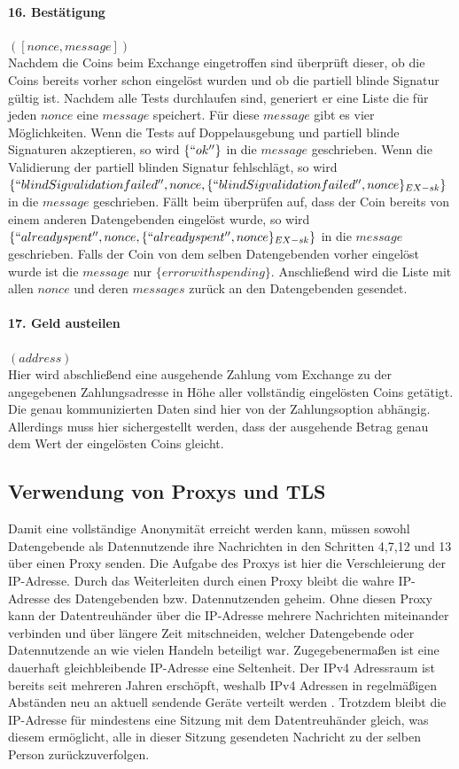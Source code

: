 \documentclass[
	fontsize=12pt,
	headings=small,
	parskip=half,           %
	bibliography=totoc,
	numbers=noenddot,       %
	open=any,               %
]{scrreprt}
\begin{document}
\paragraph{16. Bestätigung} $([nonce, message])$\\
Nachdem die Coins beim Exchange eingetroffen sind überprüft dieser, ob die Coins bereits vorher schon eingelöst wurden und ob die partiell blinde Signatur gültig ist. Nachdem alle Tests durchlaufen sind, generiert er eine Liste die für jeden $nonce$ eine $message$ speichert. Für diese $message$ gibt es vier Möglichkeiten. Wenn die Tests auf Doppelausgebung und partiell blinde Signaturen akzeptieren, so wird $\{``ok''\}$ in die $message$ geschrieben. Wenn die Validierung der partiell blinden Signatur fehlschlägt, so wird $\{``blindSig validation failed'', nonce, \{``blindSig validation failed'', nonce\}_{EX-sk}\}$ in die $message$ geschrieben. Fällt beim überprüfen auf, dass der Coin bereits von einem anderen Datengebenden eingelöst wurde, so wird $\{``already spent'', nonce, \{``already spent'', nonce\}_{EX-sk}\}$ in die $message$ geschrieben. Falls der Coin von dem selben Datengebenden vorher eingelöst wurde ist die $message$ nur $\{error with spending\}$. Anschließend wird die Liste mit allen $nonce$ und deren $messages$ zurück an den Datengebenden gesendet.

\paragraph{17. Geld austeilen} $(address)$\\
Hier wird abschließend eine ausgehende Zahlung vom Exchange zu der angegebenen Zahlungsadresse in Höhe aller vollständig eingelösten Coins getätigt. Die genau kommunizierten Daten sind hier von der Zahlungsoption abhängig. Allerdings muss hier sichergestellt werden, dass der ausgehende Betrag genau dem Wert der eingelösten Coins gleicht.

\subsection{Verwendung von Proxys und TLS} 
Damit eine vollständige Anonymität erreicht werden kann, müssen sowohl Datengebende als Datennutzende ihre Nachrichten in den Schritten 4,7,12 und 13 über einen Proxy senden. Die Aufgabe des Proxys ist hier die Verschleierung der IP-Adresse. Durch das Weiterleiten durch einen Proxy bleibt die wahre IP-Adresse des Datengebenden bzw. Datennutzenden geheim. Ohne diesen Proxy kann der Datentreuhänder über die IP-Adresse mehrere Nachrichten miteinander verbinden und über längere Zeit mitschneiden, welcher Datengebende oder Datennutzende an wie vielen Handeln beteiligt war. Zugegebenermaßen ist eine dauerhaft gleichbleibende IP-Adresse eine Seltenheit. Der IPv4 Adressraum ist bereits seit mehreren Jahren erschöpft, weshalb IPv4 Adressen in regelmäßigen Abständen neu an aktuell sendende Geräte verteilt werden . Trotzdem bleibt die IP-Adresse für mindestens eine Sitzung mit dem Datentreuhänder gleich, was diesem ermöglicht, alle in dieser Sitzung gesendeten Nachricht zu der selben Person zurückzuverfolgen. 
\end{document}

